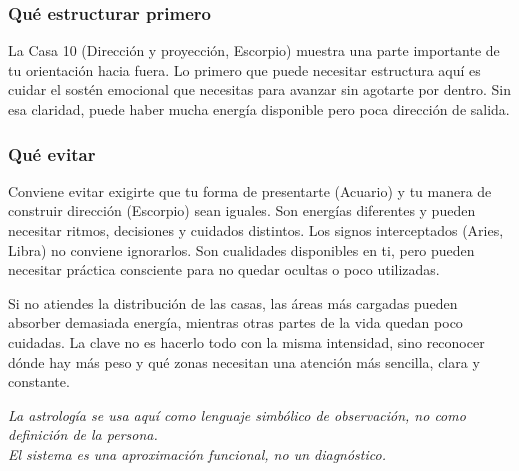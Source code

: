 \documentclass[11pt,a4paper]{article}
\begin{document}
\subsubsection*{Qué estructurar primero}
La Casa 10 (Dirección y proyección, Escorpio) muestra una parte importante de tu orientación hacia fuera. Lo primero que puede necesitar estructura aquí es cuidar el sostén emocional que necesitas para avanzar sin agotarte por dentro. Sin esa claridad, puede haber mucha energía disponible pero poca dirección de salida.

\subsubsection*{Qué evitar}
Conviene evitar exigirte que tu forma de presentarte (Acuario) y tu manera de construir dirección (Escorpio) sean iguales. Son energías diferentes y pueden necesitar ritmos, decisiones y cuidados distintos. Los signos interceptados (Aries, Libra) no conviene ignorarlos. Son cualidades disponibles en ti, pero pueden necesitar práctica consciente para no quedar ocultas o poco utilizadas.

\vspace{0.6cm}
Si no atiendes la distribución de las casas, las áreas más cargadas pueden absorber demasiada energía, mientras otras partes de la vida quedan poco cuidadas. La clave no es hacerlo todo con la misma intensidad, sino reconocer dónde hay más peso y qué zonas necesitan una atención más sencilla, clara y constante.

\vspace{0.5cm}
\begin{center}
{\small\itshape\color{grisai}
La astrología se usa aquí como lenguaje simbólico de observación, no como definición de la persona.\\
El sistema es una aproximación funcional, no un diagnóstico.
}
\end{center}
\end{document}
